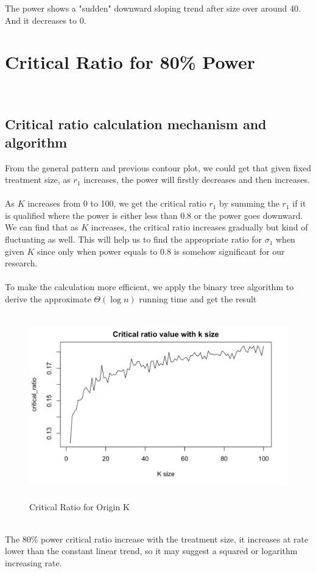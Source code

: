 \documentclass[english]{article}\usepackage{graphicx, color}
\numberwithin{equation}{section}
\numberwithin{figure}{section}
\begin{document}
The power shows a "sudden" downward sloping trend after size over around 40. And it decreases to 0.



\section{Critical Ratio for 80\% Power}
\quad\\
\subsection{Critical ratio calculation mechanism and algorithm}
From the general pattern and previous contour plot, we could get that given fixed treatment size, as $r_1$ increases, the power will firstly decreases and then increases.\\
\quad\\
As $K$ increases from 0 to 100, we get the critical ratio $r_1$ by summing the $r_1$ if it is qualified where the power is either less than 0.8 or the power goes downward. We can find that as $K$ increases, the critical ratio increases gradually but kind of fluctuating as well. This will help us to find the appropriate ratio for $\sigma_1$ when given $K$ since only when power equals to 0.8 is somehow significant for our research.\\
\quad\\
To make the calculation more efficient, we apply the binary tree algorithm to derive the approximate $\Theta{(\log{n})}$ running time and get the result

\begin{figure}[htbp]
\centering\includegraphics[width=4.8in,height=3.15in]{100}
\caption{Critical Ratio for Origin K}
\end{figure}
\quad\\
The 80\% power critical ratio increase with the treatment size, it increases at rate lower than the constant linear trend, so it may suggest a squared or logarithm increasing rate.
\end{document}
